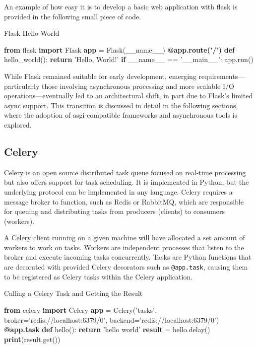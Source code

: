 An example of how easy it is to develop a basic web application with flask is provided in the following small 
piece of code.

\begin{algorithm}
  \caption{Flask Hello World}\label{flask-hello-world}
  \begin{algorithmic}[1]
    \State \textbf{from} flask \textbf{import} Flask
    \State \textbf{app} = Flask(\_\_name\_\_)
    \State
    \State \textbf{@app.route('/')}
    \State \textbf{def} hello\_world():
    \State \hspace{1em} \textbf{return} 'Hello, World!'
    \State
    \State \textbf{if} \_\_name\_\_ == '\_\_main\_\_':
    \State \hspace{1em} app.run()
  \end{algorithmic}
\end{algorithm}

While Flask remained suitable for early development, emerging requirements—particularly those involving asynchronous 
processing and more scalable I/O operations—eventually led to an architectural shift, in part due to Flask's limited async 
support. This transition is discussed in detail in the following sections, where the adoption of \ac{asgi}-compatible 
frameworks and asynchronous tools is explored.

\subsection{Celery}
Celery is an open source distributed task queue focused on real-time processing but also offers support for task scheduling.
It is implemented in Python, but the underlying protocol can be implemented in any language. Celery requires a message broker 
to function, such as Redis or RabbitMQ, which are responsible for queuing and distributing tasks from producers (clients) to 
consumers (workers).

A Celery client running on a given machine will have allocated a set amount of workers to work on tasks. Workers are 
independent processes that listen to the broker and execute incoming tasks concurrently. Tasks are Python functions that 
are decorated with provided Celery decorators such as \texttt{@app.task}, causing them to be registered as Celery tasks 
within the Celery application.

\begin{algorithm}
  \caption{Calling a Celery Task and Getting the Result}\label{celery-call-result}
  \begin{algorithmic}[1]
    \State \textbf{from} celery \textbf{import} Celery
    \State
    \State \textbf{app} = Celery('tasks', broker='redis://localhost:6379/0', backend='redis://localhost:6379/0')
    \State
    \State \textbf{@app.task}
    \State \textbf{def} hello():
    \State \hspace{1em} \textbf{return} 'hello world'
    \State
    \State \textbf{result} = hello.delay()
    \State \textbf{print}(result.get())
  \end{algorithmic}
\end{algorithm}

